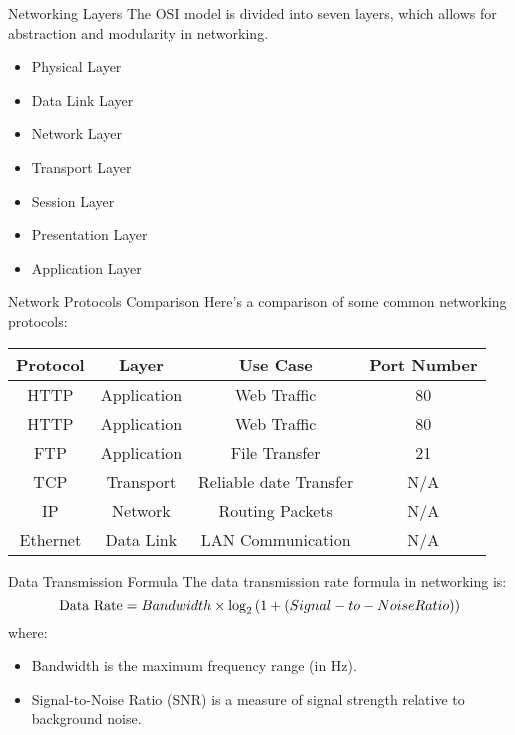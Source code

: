 \documentclass[11pt]{beamer}
\begin{document}
	\begin{frame}
		{Networking Layers}
		The OSI model is divided into seven layers, which allows for
		abstraction and modularity in networking.
		\begin{itemize}
			\item Physical Layer\pause
			\item Data Link Layer\pause
			\item Network Layer\pause
			\item Transport Layer\pause
			\item Session Layer\pause
			\item Presentation Layer\pause
			\item Application Layer
		\end{itemize}
	\end{frame}
	\begin{frame}
		{Network Protocols Comparison}
		Here’s a comparison of some common networking protocols:
		\begin{center}
			\begin{table}[h]
				\begin{tabular}{|c|c|c|c|}\hline
					\textbf{Protocol}&\textbf{Layer}&\textbf{Use Case}&\textbf{Port Number} \\ \hline
					HTTP&Application&Web Traffic&80 \\ \hline
					HTTP&Application&Web
					Traffic&80 \\ \hline
					FTP&Application&File Transfer&21 \\ \hline	TCP&Transport&Reliable date Transfer&N/A \\ \hline	IP&Network&Routing Packets&N/A \\ \hline	Ethernet&Data Link&LAN Communication&N/A \\ \hline
				\end{tabular}
			\end{table}
		\end{center}
	\end{frame}
	
	\begin{frame}
		{Data Transmission Formula}
		The data transmission rate formula in networking is:
		\[\text{Data Rate} = Bandwidth\times\log_{2}
		{(1+\text(Signal-to-Noise Ratio))}\]
		where:
		\begin{itemize}
			\item Bandwidth is the maximum frequency range (in Hz).
			\item Signal-to-Noise Ratio (SNR) is a measure of signal strength
			relative to background noise.
		\end{itemize}
	\end{frame}
	
\end{document}
